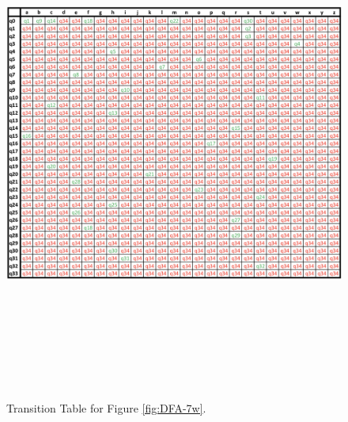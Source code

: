 \documentclass[letter, 12pt]{article}
\begin{document}
\begin{figure}[!htb]
  \includegraphics[width=17cm, height=17cm, keepaspectratio,]{table}
  \caption{Transition Table for Figure \ref{fig:DFA-7w}.}
  \label{fig:Table-7w}
\end{figure}
\clearpage
\end{document}
